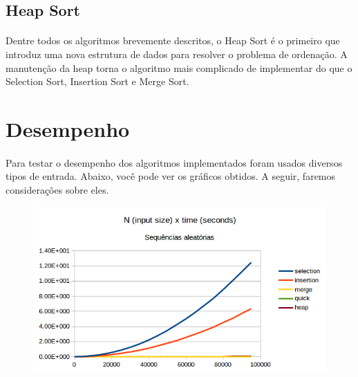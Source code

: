 \documentclass[11pt,a4paper]{article}
\begin{document}
        \subsection{Heap Sort}
        \paragraph{}
        Dentre todos os algoritmos brevemente descritos, o Heap Sort é o primeiro que introduz uma nova estrutura de dados para resolver o problema de ordenação. A manutenção da heap torna o algoritmo mais complicado de implementar do que o Selection Sort, Insertion Sort e Merge Sort.  
        \paragraph{}


    \section{Desempenho}
        \paragraph{}
        Para testar o desempenho dos algoritmos implementados foram usados diversos tipos de entrada. Abaixo, você pode ver os gráficos obtidos. A seguir, faremos considerações sobre eles.

\begin{figure}[]
  \begin{center}
      \includegraphics[width=1\textwidth]{random}
  \end{center}
      \label{fig:a}
\end{figure}
\end{document}
